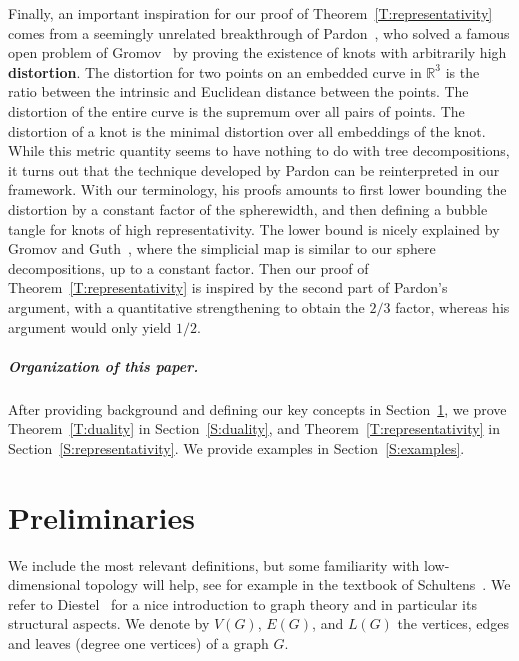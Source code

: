 \documentclass[11pt,a4paper]{article}
\begin{document}
Finally, an important inspiration for our proof of Theorem~\ref{T:representativity} comes from a seemingly unrelated breakthrough of Pardon~\cite{Pardon_distortion}, who solved a famous open problem of Gromov~\cite{gromov} by proving the existence of knots with arbitrarily high \textbf{distortion}. The distortion for two points on an embedded curve in $\mathbb{R}^3$ is the ratio between the intrinsic and Euclidean distance between the points. The distortion of the entire curve is the supremum over all pairs of points. The distortion of a knot is the minimal distortion over all embeddings of the knot. While this metric quantity seems to have nothing to do with tree decompositions, it turns out that the technique developed by Pardon can be reinterpreted in our framework. With our terminology, his proofs amounts to first lower bounding the distortion by a constant factor of the spherewidth, and then defining a bubble tangle for knots of high representativity. The lower bound is nicely explained by Gromov and Guth~\cite[Lemma~4.2]{gromovguth}, where the simplicial map is similar to our sphere decompositions, up to a constant factor. Then our proof of Theorem~\ref{T:representativity} is inspired by the second part of Pardon's argument, with a quantitative strengthening to obtain the $2/3$ factor, whereas his argument would only yield $1/2$.


\subparagraph*{Organization of this paper.} After providing background and defining our key concepts in Section~\ref{S:prelim}, we prove Theorem~\ref{T:duality} in Section~\ref{S:duality}, and Theorem~\ref{T:representativity} in Section~\ref{S:representativity}. We provide examples in Section~\ref{S:examples}. %


\section{Preliminaries}\label{S:prelim}

We include the most relevant definitions, but some familiarity with low-dimensional topology will help, see for example in the textbook of Schultens~\cite{schultensbook}. We refer to Diestel~\cite{Diestel_Graph_Theory} for a nice introduction to graph theory and in particular its structural aspects. We denote by $V(G)$, $E(G)$, and $L(G)$ the vertices, edges and leaves (degree one vertices) of a graph $G$.
\end{document}
